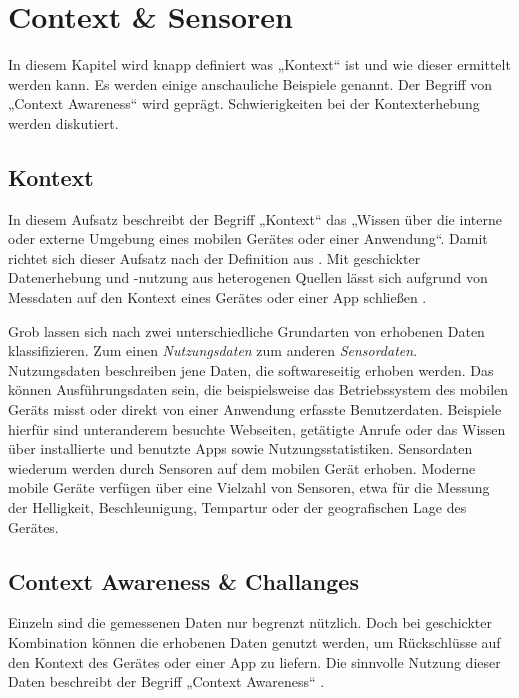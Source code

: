 \chapter{Context \& Sensoren}
\label{chap:context}

In diesem Kapitel wird knapp definiert was „Kontext“ ist und wie dieser ermittelt werden kann. Es werden einige anschauliche Beispiele genannt. Der Begriff von „Context Awareness“ wird geprägt. Schwierigkeiten bei der Kontexterhebung werden diskutiert.

\section{Kontext}

In diesem Aufsatz beschreibt der Begriff „Kontext“ das „Wissen über die interne oder externe Umgebung eines mobilen Gerätes oder einer Anwendung“. Damit richtet sich dieser Aufsatz nach der Definition aus \cite{context2015}. Mit geschickter Datenerhebung und -nutzung aus heterogenen Quellen lässt sich aufgrund von Messdaten auf den Kontext eines Gerätes oder einer App schließen \cite{orsini2016}.

Grob lassen sich nach \cite{context2015} zwei unterschiedliche Grundarten von erhobenen Daten klassifizieren. Zum einen \textit{Nutzungsdaten} zum anderen \textit{Sensordaten}. Nutzungsdaten beschreiben jene Daten, die softwareseitig erhoben werden. Das können Ausführungsdaten sein, die beispielsweise das Betriebssystem des mobilen Geräts misst oder direkt von einer Anwendung erfasste Benutzerdaten. Beispiele hierfür sind unteranderem besuchte Webseiten, getätigte Anrufe oder das Wissen über installierte und benutzte Apps sowie Nutzungsstatistiken. Sensordaten wiederum werden durch Sensoren auf dem mobilen Gerät erhoben. Moderne mobile Geräte verfügen über eine Vielzahl von Sensoren, etwa für die Messung der Helligkeit, Beschleunigung, Tempartur oder der geografischen Lage des Gerätes.

\section{Context Awareness \& Challanges}

Einzeln sind die gemessenen Daten nur begrenzt nützlich. Doch bei geschickter Kombination können die erhobenen Daten genutzt werden, um Rückschlüsse auf den Kontext des Gerätes oder einer App zu liefern. Die sinnvolle Nutzung dieser Daten beschreibt der Begriff „Context Awareness“ \cite{context2015, orsini2016}.

